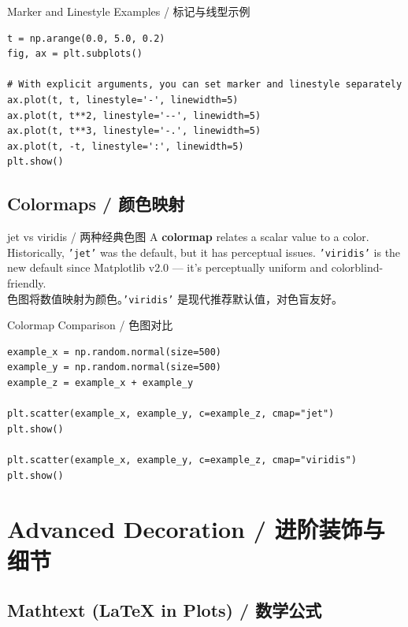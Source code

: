 \documentclass[11pt,a4paper]{article}
\begin{document}
\begin{examplebox}{Marker and Linestyle Examples / 标记与线型示例}
\begin{lstlisting}
t = np.arange(0.0, 5.0, 0.2)
fig, ax = plt.subplots()

# With explicit arguments, you can set marker and linestyle separately
ax.plot(t, t, linestyle='-', linewidth=5)
ax.plot(t, t**2, linestyle='--', linewidth=5)
ax.plot(t, t**3, linestyle='-.', linewidth=5)
ax.plot(t, -t, linestyle=':', linewidth=5)
plt.show()
\end{lstlisting}
\end{examplebox}

\subsection{Colormaps / 颜色映射}

\begin{concept}{jet vs viridis / 两种经典色图}
    A \textbf{colormap} relates a scalar value to a color. Historically, \texttt{'jet'} was the default, but it has perceptual issues. \texttt{'viridis'} is the new default since Matplotlib v2.0 — it's perceptually uniform and colorblind-friendly. \\
    色图将数值映射为颜色。\texttt{'viridis'} 是现代推荐默认值，对色盲友好。
\end{concept}

\begin{examplebox}{Colormap Comparison / 色图对比}
\begin{lstlisting}
example_x = np.random.normal(size=500)
example_y = np.random.normal(size=500)
example_z = example_x + example_y

plt.scatter(example_x, example_y, c=example_z, cmap="jet")
plt.show()

plt.scatter(example_x, example_y, c=example_z, cmap="viridis")
plt.show()
\end{lstlisting}
\end{examplebox}

\section{Advanced Decoration / 进阶装饰与细节}

\subsection{Mathtext (LaTeX in Plots) / 数学公式}
\end{document}
